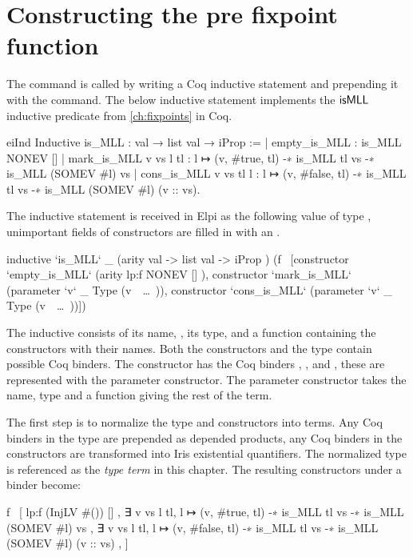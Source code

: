 \documentclass[thesis.tex]{subfiles}
\begin{document}
\section{Constructing the pre fixpoint function}\label{sec:pff}
The  command is called by writing a Coq inductive statement and prepending it with the  command. The below inductive statement implements the $\textsf{\upshape isMLL}$ inductive predicate from \cref{ch:fixpoints} in Coq.
\begin{coqcode}
  eiInd
  Inductive is_MLL : val → list val → iProp :=
      | empty_is_MLL : is_MLL NONEV []
      | mark_is_MLL v vs l tl : 
        l ↦ (v, #true, tl) -∗ is_MLL tl vs -∗ 
        is_MLL (SOMEV #l) vs
      | cons_is_MLL v vs tl l : 
        l ↦ (v, #false, tl) -∗ is_MLL tl vs -∗ 
        is_MLL (SOMEV #l) (v :: vs).
\end{coqcode}
The inductive statement is received in Elpi as the following value of type , unimportant fields of constructors are filled in with an \elpii{_}.
\begin{elpicode}
  inductive `is_MLL` _ 
    (arity {{ val -> list val -> iProp }})
    (f \ [constructor `empty_is_MLL` 
            (arity {{ lp:f NONEV [] }}), 
          constructor `mark_is_MLL` 
            (parameter `v` _ Type (v\ ~\ldots~)),
          constructor `cons_is_MLL` 
            (parameter `v` _ Type (v\ ~\ldots~))])
\end{elpicode}
The inductive consists of its name, , its type, and a function containing the constructors with their names. Both the constructors and the type contain possible Coq binders. The constructor  has the Coq binders , ,  and , these are represented with the parameter constructor. The parameter constructor takes the name, type and a function giving the rest of the term.

The first step is to normalize the type and constructors into terms. Any Coq binders in the type are prepended as depended products, any Coq binders in the constructors are transformed into Iris existential quantifiers. The normalized type is referenced as the \emph{type term} in this chapter. The resulting constructors under a binder become:
\begin{elpicode}
  f \ [
    {{ lp:f (InjLV #()) [] }},
    {{ ∃ v vs l tl, l ↦ (v, #true, tl) -∗ is_MLL tl vs -∗ 
                    is_MLL (SOMEV #l) vs }},
    {{ ∃ v vs l tl, l ↦ (v, #false, tl) -∗ is_MLL tl vs -∗ 
                    is_MLL (SOMEV #l) (v :: vs) }},
  ]
\end{elpicode}
\end{document}
